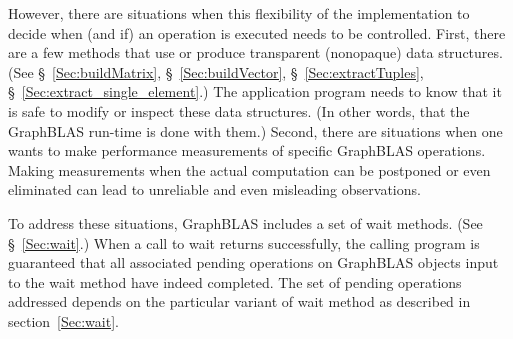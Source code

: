 However, there are situations when this flexibility of the implementation 
to decide when (and if) an operation is executed needs to be controlled. 
First, there are a few methods that use or produce transparent
(nonopaque) data structures. (See \S~\ref{Sec:buildMatrix}, 
\S~\ref{Sec:buildVector}, \S~\ref{Sec:extractTuples}, 
\S~\ref{Sec:extract_single_element}.) The application program needs to 
know that it is safe to modify or inspect these data structures. 
(In other words, that the GraphBLAS run-time is done with them.)
Second, there are situations when one wants to make performance 
measurements of specific GraphBLAS operations. Making measurements 
when the actual computation can be postponed or even 
eliminated can lead to unreliable and even misleading observations.

To address these situations, GraphBLAS includes a set of {\sf wait} 
methods. (See \S~\ref{Sec:wait}.) When a call to {\sf wait} returns 
successfully, the calling program is guaranteed that all associated
pending operations on GraphBLAS objects input to the {\sf wait} method
have indeed completed. The set of pending operations 
addressed depends on the particular variant of {\sf wait} method
as described in section~\ref{Sec:wait}.

